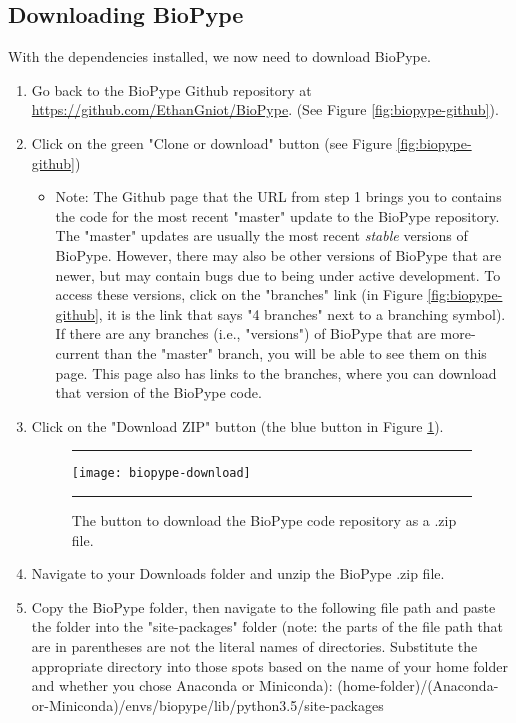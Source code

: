 \begin{enumerate}
    
    \end{enumerate}


\subsection{Downloading BioPype}

With the dependencies installed, we now need to download BioPype. 

\begin{enumerate}
\item Go back to the BioPype Github repository at \url{https://github.com/EthanGniot/BioPype}. (See Figure \ref{fig:biopype-github}).

\item Click on the green "Clone or download" button (see Figure \ref{fig:biopype-github})
    \begin{itemize}
    \item \small Note: The Github page that the URL from step 1 brings you to contains the code for the most recent "master" update to the BioPype repository. The "master" updates are usually the most recent \textit{stable} versions of BioPype. However, there may also be other versions of BioPype that are newer, but may contain bugs due to being under active development. To access these versions, click on the "branches" link (in Figure \ref{fig:biopype-github}, it is the link that says "4 branches" next to a branching symbol). If there are any branches (i.e., "versions") of BioPype that are more-current than the "master" branch, you will be able to see them on this page. This page also has links to the branches, where you can download that version of the BioPype code.
    \end{itemize}
%
\item Click on the "Download ZIP" button (the blue button in Figure \ref{fig:biopype-download}).
    \begin{figure}[hbtp]
        \begin{maxipage}
        \hrule
        \centering
        \texttt{[image: biopype-download]}
        \caption{The button to download the BioPype code repository as a .zip file.}
        \label{fig:biopype-download}
        \hrule
        \end{maxipage}
    \end{figure}
    

\item Navigate to your Downloads folder and unzip the BioPype .zip file. 


\item Copy the BioPype folder, then navigate to the following file path and paste the folder into the "site-packages" folder (note: the parts of the file path that are in parentheses are not the literal names of directories. Substitute the appropriate directory into those spots based on the name of your home folder and whether you chose Anaconda or Miniconda):\newline
(home-folder)/(Anaconda-or-Miniconda)/envs/biopype/lib/python3.5/site-packages

\end{enumerate}


